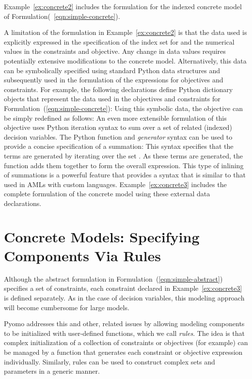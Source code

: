 Example~\ref{ex:concrete2} includes the formulation for the indexed concrete model of Formulation(~\ref{eqn:simple-concrete}).

A limitation of the formulation in Example~\ref{ex:concrete2}
is that the data used is explicitly expressed in the specification of
the index set for  and the numerical values in the constraints
and objective. Any change in data values requires potentially extensive
modifications to the concrete model. Alternatively, this data can be
symbolically specified using standard Python data structures and subsequently
used in the formulation of the expressions for objectives and constraints.  
For example, the following declarations define Python dictionary objects 
that represent the data used in the objectives and constraints for
Formulation~(\ref{eqn:simple-concrete}):
Using this symbolic data, the objective can be simply redefined as follows:
An even more extensible formulation of this objective uses Python 
iteration syntax to sum over a set of related (indexed) decision variables.  
The Python  function and {\em generator} syntax can be used 
to provide a concise specification of a summation:
This syntax specifies that the terms  are generated
by iterating over the set .  As these terms are generated, the
function  adds them together to form the overall expression.
This type of inlining of summations is a powerful feature that provides
a syntax that is similar to that used in AMLs with custom languages.
Example~\ref{ex:concrete3} includes the complete formulation of the concrete model using these
external data declarations.


\section{Concrete Models: Specifying Components Via Rules}

Although the abstract formulation in Formulation~(\ref{eqn:simple-abstract})
specifies a set of constraints, each constraint declared in
Example~\ref{ex:concrete3} is defined separately.  As in the case of 
decision variables, this modeling approach will become cumbersome
for large models.

Pyomo addresses this and other, related issues by allowing modeling components
to be initialized with user-defined functions, which we call 
{\em rules}.  The idea is that complex initialization of a
collection of constraints or objectives (for example) can be managed by a function 
that generates each constraint or objective expression individually.  Similarly, rules
can be used to construct complex sets and parameters in a generic manner.

